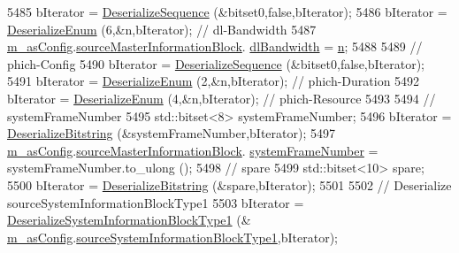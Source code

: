 \begin{DoxyCode}
5485               bIterator = \hyperlink{classns3_1_1Asn1Header_a58c68bb97ba3fe2e8fcdd7c208d672b2}{DeserializeSequence} (&bitset0,\textcolor{keyword}{false},bIterator);
5486               bIterator = \hyperlink{classns3_1_1Asn1Header_a4fcc253e0eec3483c775b005c1875f2d}{DeserializeEnum} (6,&n,bIterator); \textcolor{comment}{// dl-Bandwidth}
5487               \hyperlink{classns3_1_1HandoverPreparationInfoHeader_adfafc689e36800c0c59d495f74e3bdc1}{m\_asConfig}.\hyperlink{structns3_1_1LteRrcSap_1_1AsConfig_a1588aaf39ff0a8898119529aec23d94a}{sourceMasterInformationBlock}.
      \hyperlink{structns3_1_1LteRrcSap_1_1MasterInformationBlock_a1afa3b3425bd8be026923486fad7af8c}{dlBandwidth} = \hyperlink{namespacesample-rng-plot_aeb5ee5c431e338ef39b7ac5431242e1d}{n};
5488 
5489               \textcolor{comment}{// phich-Config}
5490               bIterator = \hyperlink{classns3_1_1Asn1Header_a58c68bb97ba3fe2e8fcdd7c208d672b2}{DeserializeSequence} (&bitset0,\textcolor{keyword}{false},bIterator);
5491               bIterator = \hyperlink{classns3_1_1Asn1Header_a4fcc253e0eec3483c775b005c1875f2d}{DeserializeEnum} (2,&n,bIterator); \textcolor{comment}{// phich-Duration}
5492               bIterator = \hyperlink{classns3_1_1Asn1Header_a4fcc253e0eec3483c775b005c1875f2d}{DeserializeEnum} (4,&n,bIterator); \textcolor{comment}{// phich-Resource}
5493 
5494               \textcolor{comment}{// systemFrameNumber}
5495               std::bitset<8> systemFrameNumber;
5496               bIterator = \hyperlink{classns3_1_1Asn1Header_adb34498b05e8562fba5d40f49578968d}{DeserializeBitstring} (&systemFrameNumber,bIterator);
5497               \hyperlink{classns3_1_1HandoverPreparationInfoHeader_adfafc689e36800c0c59d495f74e3bdc1}{m\_asConfig}.\hyperlink{structns3_1_1LteRrcSap_1_1AsConfig_a1588aaf39ff0a8898119529aec23d94a}{sourceMasterInformationBlock}.
      \hyperlink{structns3_1_1LteRrcSap_1_1MasterInformationBlock_a916d46a429b91317c9adfdd6f651f059}{systemFrameNumber} = systemFrameNumber.to\_ulong ();
5498               \textcolor{comment}{// spare}
5499               std::bitset<10> spare;
5500               bIterator = \hyperlink{classns3_1_1Asn1Header_adb34498b05e8562fba5d40f49578968d}{DeserializeBitstring} (&spare,bIterator);
5501 
5502               \textcolor{comment}{// Deserialize sourceSystemInformationBlockType1}
5503               bIterator = \hyperlink{classns3_1_1RrcAsn1Header_ac63bc948e0d48d46dae3154c78d4c9f7}{DeserializeSystemInformationBlockType1} (&
      \hyperlink{classns3_1_1HandoverPreparationInfoHeader_adfafc689e36800c0c59d495f74e3bdc1}{m\_asConfig}.\hyperlink{structns3_1_1LteRrcSap_1_1AsConfig_a5de40852fd35dbeeb19990a23ccf0a66}{sourceSystemInformationBlockType1},bIterator);

\end{DoxyCode}
